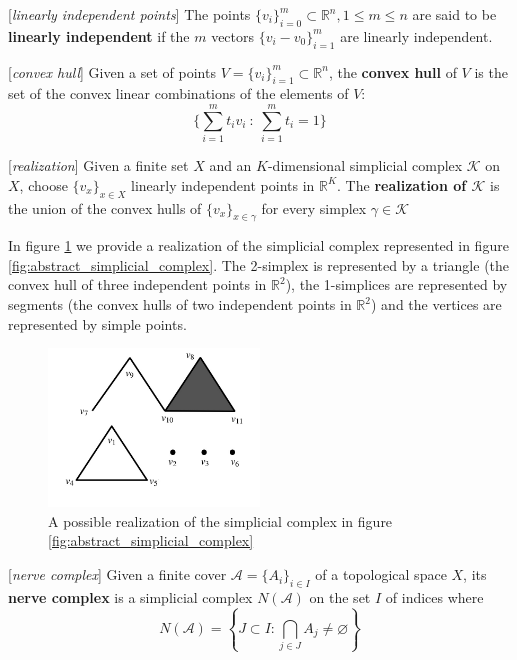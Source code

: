 \begin{definition}{[\textit{linearly independent points}]}
	The points $\{v_i\}_{i=0}^m \subset \mathbb{R}^n, 1\leq m\leq n$ are said to be \textbf{linearly independent} if the $m$ vectors $\{v_i-v_0\}_{i=1}^m$ are linearly independent.
\end{definition}
\begin{definition}{[\textit{convex hull}]}
	Given a set of points  $V = \{v_i\}_{i=1}^m \subset \mathbb{R}^n$, the \textbf{convex hull} of $V$ is the set of the convex linear combinations of the elements of $V$: $$ \{\sum_{i=1}^m{t_iv_i}\ :\ \sum_{i=1}^m{t_i}=1\}$$ 
\end{definition}
\begin{definition}{[\textit{realization}]}
	Given a finite set $X$ and an $K$-dimensional simplicial complex $\mathcal{K}$ on $X$, choose $\{v_x\}_{x\in X}$ linearly independent points in $\mathbb{R}^K$. The \textbf{realization of $\mathcal{K}$} is the union of the convex hulls of $\{v_x\}_{x\in \gamma}$ for every  simplex $\gamma\in\mathcal{K}$																														
\end{definition}

In figure \ref{fig:simplicial_complex} we provide a realization of the simplicial complex represented in figure \ref{fig:abstract_simplicial_complex}. The 2-simplex is represented by a triangle (the convex hull of three independent points in $\mathbb{R}^2$), the 1-simplices are represented by segments (the convex hulls of two independent points in $\mathbb{R}^2$) and the vertices are represented by simple points.
\begin{figure}[htbp!] 
	\centering    
	\includegraphics[width=0.5\textwidth]{simplicial_complex.jpg}
	\caption{A possible realization of the simplicial complex in figure  \ref{fig:abstract_simplicial_complex} }
	\label{fig:simplicial_complex}
\end{figure}

\begin{definition}{[\textit{nerve complex}]}
	Given a finite cover $\mathcal{A} = \{A_i\}_{i \in I}$ of a topological space $X$, its \textbf{nerve complex} is a simplicial complex $N(\mathcal{A})$ on the set $I$ of indices where $$N(\mathcal{A}) = \left\{J\subset I\colon\bigcap_{j\in J} A_j\neq \varnothing\right\}$$
\end{definition}

